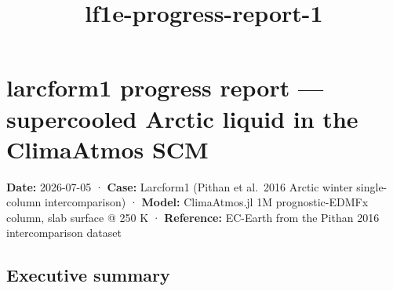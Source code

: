 \documentclass[11pt]{article}
\title{lf1e-progress-report-1}
\begin{document}
    
    \maketitle
    
    

    
    \section{larcform1 progress report --- supercooled Arctic liquid in the
ClimaAtmos
SCM}\label{larcform1-progress-report-supercooled-arctic-liquid-in-the-climaatmos-scm}

\textbf{Date:} 2026-07-05 · \textbf{Case:} Larcform1 (Pithan et al.~2016
Arctic winter single-column intercomparison) · \textbf{Model:}
ClimaAtmos.jl 1M prognostic-EDMFx column, slab surface @ 250 K ·
\textbf{Reference:} EC-Earth from the Pithan 2016 intercomparison
dataset

\subsection{Executive summary}\label{executive-summary}
\end{document}
